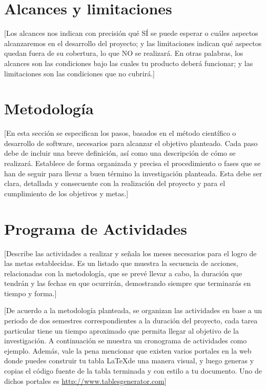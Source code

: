 \documentclass[final,12pt]{article}
\begin{document}
\section{Alcances y limitaciones}

[Los alcances nos indican con precisión qué SÍ se puede esperar o cuáles aspectos alcanzaremos en el desarrollo del proyecto; y las limitaciones indican qué aspectos quedan fuera de su cobertura, lo que NO se realizará. 
En otras palabras, los alcances son las condiciones bajo las cuales tu producto deberá funcionar; y las limitaciones son las condiciones que no cubrirá.]

\section{Metodología}
[En esta sección se especifican los pasos, basados en el método científico o desarrollo de software, necesarios para alcanzar el objetivo planteado. 
Cada paso debe de incluir una breve definición, así como una descripción de cómo se realizará.
Establece de forma organizada y precisa el procedimiento o fases que se han de seguir para llevar a buen término la investigación planteada. 
Esta debe ser  clara, detallada y consecuente con la realización del proyecto y para el cumplimiento de los objetivos y metas.]



\section{Programa de Actividades}

[Describe las actividades a realizar y señala los meses necesarios para el logro de las metas establecidas.
Es un listado que muestra la secuencia de acciones, relacionadas con la metodología, que se prevé llevar a cabo, la duración que tendrán y las fechas en que ocurrirán, demostrando siempre que terminarás en tiempo y forma.]


[De acuerdo a la metodología planteada, se organizan las actividades en base a un periodo de dos semestres correspondientes a la duración del proyecto, cada tarea particular tiene un tiempo aproximado que permita llegar al objetivo de la investigación.
A continuación se muestra un cronograma de actividades como ejemplo. 
Además, vale la pena mencionar que existen varios portales en la web donde puedes construir tu tabla \LaTeX de una manera visual, y luego generas y copias el código fuente de la tabla terminada y con estilo a tu documento. Uno de dichos portales es \url{http://www.tablesgenerator.com}]
\end{document}
